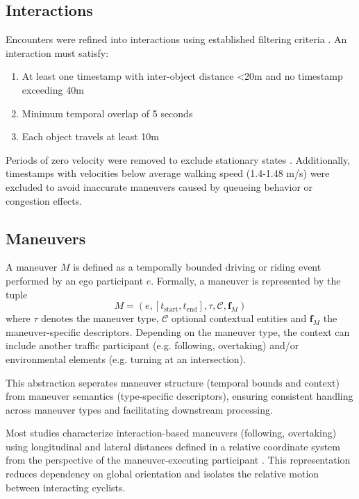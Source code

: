 \subsection{Interactions}
Encounters were refined into interactions using established filtering criteria \cite{kutsch_analyzing_2025}. An interaction must satisfy:
\begin{enumerate}
	\item At least one timestamp with inter-object distance <20m and no timestamp exceeding 40m
	\item Minimum temporal overlap of 5 seconds
	\item Each object travels at least 10m
\end{enumerate} 

Periods of zero velocity were removed to exclude stationary states \cite{mohammadnazar_classifying_2021, li_volatility-based_2025}. Additionally, timestamps with velocities below average walking speed (1.4-1.48 m/s) \cite{bartels_bewegungsverhalten_2014} were excluded to avoid inaccurate maneuvers caused by queueing behavior or congestion effects.

\subsection{Maneuvers}
A maneuver $M$ is defined as a temporally bounded driving or riding event performed by an ego participant $e$. Formally, a maneuver is represented by the tuple
$$M = (e,[t_\text{start},t_\text{end}], \tau, \mathcal{C},\mathbf{f}_M)$$
where  $\tau$ denotes the maneuver type, $\mathcal{C}$ optional contextual entities and $\mathbf{f}_M$ the maneuver-specific descriptors.
Depending on the maneuver type, the context can include another traffic participant (e.g. following, overtaking) and/or environmental elements (e.g. turning at an intersection).

This abstraction seperates maneuver structure (temporal bounds and context) from maneuver semantics (type-specific descriptors), ensuring consistent handling across maneuver types and facilitating downstream processing.


Most studies characterize interaction-based maneuvers (following, overtaking) using longitudinal and lateral distances defined in a relative coordinate system from the perspective of the maneuver-executing participant \cite{khan_characteristics_2001, kutsch_analyzing_2025, mohammed_characterization_2019}. This representation reduces dependency on global orientation and isolates the relative motion between interacting cyclists.

